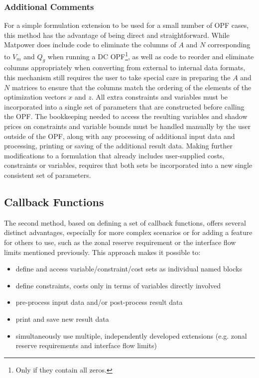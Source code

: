 \documentclass[12pt]{article}
\newcommand{\matpower}[0]{{\sc Matpower}}
\numberwithin{equation}{section}
\numberwithin{table}{section}
\numberwithin{figure}{section}
\begin{document}
\subsubsection{Additional Comments}

For a simple formulation extension to be used for a small number of OPF cases, this method has the advantage of being direct and straightforward. While \matpower{} does include code to eliminate the columns of $A$ and $N$ corresponding to $V_m$ and $Q_g$ when running a DC OPF\footnote{Only if they contain all zeros.}, as well as code to reorder and eliminate columns appropriately when converting from external to internal data formats, this mechanism still requires the user to take special care in preparing the $A$ and $N$ matrices to ensure that the columns match the ordering of the elements of the optimization vectors $x$ and $z$. All extra constraints and variables must be incorporated into a single set of parameters that are constructed before calling the OPF. The bookkeeping needed to access the resulting variables and shadow prices on constraints and variable bounds must be handled manually by the user outside of the OPF, along with any processing of additional input data and processing, printing or saving of the additional result data. Making further modifications to a formulation that already includes user-supplied costs, constraints or variables, requires that both sets be incorporated into a new single consistent set of parameters.

\subsection{Callback Functions}
\label{sec:extend_callbacks}

The second method, based on defining a set of callback functions, offers several distinct advantages, especially for more complex scenarios or for adding a feature for others to use, such as the zonal reserve requirement or the interface flow limits mentioned previously. This approach makes it possible to:

\begin{itemize}
\item define and access variable/constraint/cost sets as individual named blocks
\item define constraints, costs only in terms of variables directly involved
\item pre-process input data and/or post-process result data
\item print and save new result data
\item simultaneously use multiple, independently developed extensions (e.g. zonal reserve requirements and interface flow limits)
\end{itemize}
\end{document}
